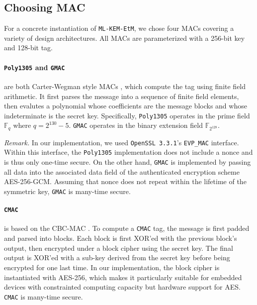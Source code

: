 \documentclass[runningheads]{llncs}
\begin{document}
\subsection{Choosing MAC}\label{sec:choosing-mac}
For a concrete instantiation of \texttt{ML-KEM-EtM}, we chose four MACs covering a variety of design architectures. All MACs are parameterized with a 256-bit key and 128-bit tag.

\paragraph{\texttt{Poly1305} \cite{DBLP:conf/fse/Bernstein05} and \texttt{\texttt{GMAC}} \cite{NIST80038D}} are both Carter-Wegman style MACs \cite{DBLP:journals/jcss/CarterW79,DBLP:journals/jcss/WegmanC81}, which compute the tag using finite field arithmetic. It first parses the message into a sequence of finite field elements, then evalutes a polynomial whose coefficients are the message blocks and whose indeterminate is the secret key. Specifically, \texttt{Poly1305} operates in the prime field $\mathbb{F}_q$ where $q = 2^{130} - 5$. \texttt{\texttt{GMAC}} operates in the binary extension field $\mathbb{F}_{2^{128}}$.

\textit{Remark.} In our implementation, we used {\tt OpenSSL 3.3.1}'s \texttt{EVP\_MAC} interface. Within this interface, the \texttt{Poly1305} implementation does not include a nonce and is thus only one-time secure. On the other hand, \texttt{GMAC} is implemented by passing all data into the associated data field of the authenticated encryption scheme AES-256-GCM. Assuming that nonce does not repeat within the lifetime of the symmetric key, \texttt{GMAC} is many-time secure.

\paragraph{\texttt{CMAC} \cite{NIST80038B}} is based on the CBC-MAC \cite{DBLP:conf/crypto/BlackR00}. To compute a \texttt{CMAC} tag, the message is first padded and parsed into blocks. Each block is first XOR'ed with the previous block's output, then encrypted under a block cipher using the secret key. The final output is XOR'ed with a sub-key derived from the secret key before being encrypted for one last time. In our implementation, the block cipher is instantiated with AES-256, which makes it particularly suitable for embedded devices with constrainted computing capacity but hardware support for AES. \texttt{CMAC} is many-time secure.
\end{document}
